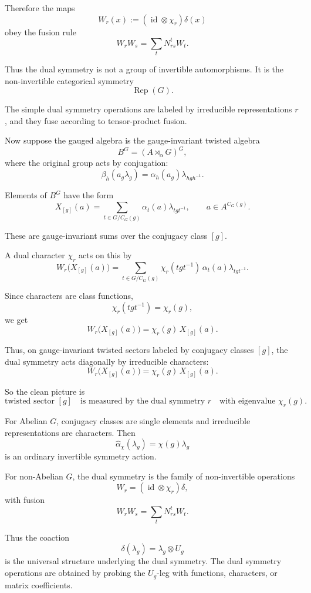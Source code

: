 \documentclass[11pt]{article}
\begin{document}
Therefore the maps
\[
W_r(x):=(\operatorname{id}\otimes \chi_r)\delta(x)
\]
obey the fusion rule
\[
W_rW_s
=
\sum_t N_{rs}^t W_t.
\]

Thus the dual symmetry is not a group of invertible automorphisms. It is the non-invertible categorical symmetry
\[
\operatorname{Rep}(G).
\]

The simple dual symmetry operations are labeled by irreducible representations \(r\), and they fuse according to tensor-product fusion.

Now suppose the gauged algebra is the gauge-invariant twisted algebra
\[
B^G=(A\rtimes_\alpha G)^G,
\]
where the original group acts by conjugation:
\[
\beta_h(a_g\lambda_g)
=
\alpha_h(a_g)\lambda_{hgh^{-1}}.
\]

Elements of \(B^G\) have the form
\[
X_{[g]}(a)
=
\sum_{t\in G/C_G(g)}
\alpha_t(a)\lambda_{tgt^{-1}},
\qquad
a\in A^{C_G(g)}.
\]

These are gauge-invariant sums over the conjugacy class \([g]\).

A dual character \(\chi_r\) acts on this by
\[
W_r\bigl(X_{[g]}(a)\bigr)
=
\sum_{t\in G/C_G(g)}
\chi_r(tgt^{-1})\,\alpha_t(a)\lambda_{tgt^{-1}}.
\]

Since characters are class functions,
\[
\chi_r(tgt^{-1})=\chi_r(g),
\]
we get
\[
W_r\bigl(X_{[g]}(a)\bigr)
=
\chi_r(g)\,X_{[g]}(a).
\]

Thus, on gauge-invariant twisted sectors labeled by conjugacy classes \([g]\), the dual symmetry acts diagonally by irreducible characters:
\[
\boxed{
W_r\bigl(X_{[g]}(a)\bigr)
=
\chi_r(g)\,X_{[g]}(a).
}
\]

So the clean picture is
\[
\boxed{
\text{twisted sector }[g]
\quad\text{is measured by the dual symmetry }r
\quad\text{with eigenvalue }\chi_r(g).
}
\]

For Abelian \(G\), conjugacy classes are single elements and irreducible representations are characters. Then
\[
\widehat\alpha_\chi(\lambda_g)=\chi(g)\lambda_g
\]
is an ordinary invertible symmetry action.

For non-Abelian \(G\), the dual symmetry is the family of non-invertible operations
\[
W_r=(\operatorname{id}\otimes\chi_r)\delta,
\]
with fusion
\[
W_rW_s=\sum_t N_{rs}^tW_t.
\]

Thus the coaction
\[
\delta(\lambda_g)=\lambda_g\otimes U_g
\]
is the universal structure underlying the dual symmetry. The dual symmetry operations are obtained by probing the \(U_g\)-leg with functions, characters, or matrix coefficients.
\end{document}
